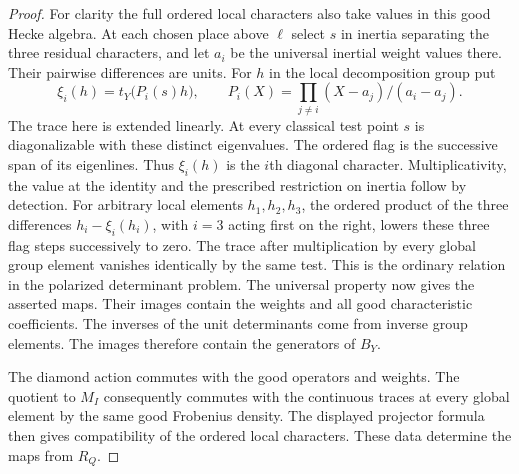 \documentclass[a4paper,11pt]{article}
\theoremstyle{definition}
\theoremstyle{remark}
\numberwithin{equation}{section}
\begin{document}
\begin{proof}
For clarity the full ordered local characters also take
values in this good Hecke algebra. At each chosen place
above \(\ell\) select \(s\) in inertia separating the three
residual characters, and let \(a_i\) be the universal
inertial weight values there. Their pairwise differences
are units. For \(h\) in the local decomposition group put
\[
      \xi_i(h)=t_Y\bigl(P_i(s)h\bigr),\qquad
      P_i(X)=\prod_{j\ne i}(X-a_j)/(a_i-a_j).
\]
The trace here is extended linearly. At every classical
test point \(s\) is diagonalizable with these distinct
eigenvalues. The ordered flag is the successive span of its
eigenlines. Thus \(\xi_i(h)\) is the \(i\)th diagonal character.
Multiplicativity, the value at the identity and the prescribed
restriction on inertia follow by detection. For arbitrary
local elements \(h_1,h_2,h_3\), the ordered product of the
three differences \(h_i-\xi_i(h_i)\), with \(i=3\) acting
first on the right, lowers these three flag steps successively
to zero. The trace after multiplication by every global
group element vanishes identically by the same test. This
is the ordinary relation in the polarized determinant
problem. The universal property now gives the asserted
maps. Their images contain the weights and all good
characteristic coefficients. The inverses of the unit
determinants come from inverse group elements. The images
therefore contain the generators of \(B_Y\).

The diamond action commutes with the good operators and
weights. The quotient to \(M_I\) consequently commutes
with the continuous traces at every global element by the
same good Frobenius density. The displayed projector formula
then gives compatibility of the ordered local characters.
These data determine the maps from \(R_Q\).
\end{proof}
\end{document}
